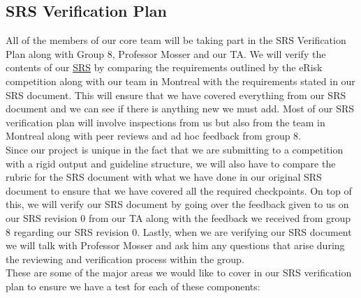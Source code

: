 \documentclass[12pt, titlepage]{article}
\begin{document}
  
  \subsection{SRS Verification Plan} \label{SRS Verification Plan}
  
  All of the members of our core team will be taking part in the SRS Verification Plan along with Group 8, Professor Mosser and our TA. We will verify the contents of our \href{https://github.com/MichaelBreau/nlp-mentalhealth/blob/main/docs/SRS/index.pdf}{SRS} by comparing the requirements outlined by the eRisk competition along with our team in Montreal with the requirements stated in our SRS document. This will ensure that we have covered everything from our SRS document and we can see if there is anything new we must add. Most of our SRS verification plan will involve inspections from us but also from the team in Montreal along with peer reviews and ad hoc feedback from group 8.\\
  
  Since our project is unique in the fact that we are submitting to a competition with a rigid output and guideline structure, we will also have to compare the rubric for the SRS document with what we have done in our original SRS document to ensure that we have covered all the required checkpoints. On top of this, we will verify our SRS document by going over the feedback given to us on our SRS revision 0 from our TA along with the feedback we received from group 8 regarding our SRS revision 0. Lastly, when we are verifying our SRS document we will talk with Professor Mosser and ask him any questions that arise during the reviewing and verification process within the group. \\

  These are some of the major areas we would like to cover in our SRS verification plan to ensure we have a test for each of these components:\\
\end{document}
